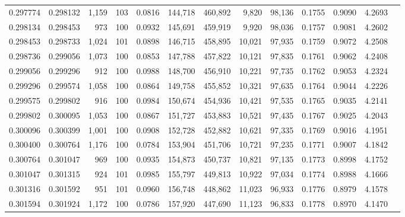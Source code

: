 \begin{tabular}{rrrrrrrrrrrrr}
0.297774 & 0.298132 & 1,159 & 103 &                                     0.0816 & 144,718 & 460,892 &   9,820 &  98,136 & 0.1755 & 0.9090 & 4.2693 \\
0.298134 & 0.298453 &   973 & 100 &                                     0.0932 & 145,691 & 459,919 &   9,920 &  98,036 & 0.1757 & 0.9081 & 4.2602 \\
0.298453 & 0.298733 & 1,024 & 101 &                                     0.0898 & 146,715 & 458,895 &  10,021 &  97,935 & 0.1759 & 0.9072 & 4.2508 \\
0.298736 & 0.299056 & 1,073 & 100 &                                     0.0853 & 147,788 & 457,822 &  10,121 &  97,835 & 0.1761 & 0.9062 & 4.2408 \\
0.299056 & 0.299296 &   912 & 100 &                                     0.0988 & 148,700 & 456,910 &  10,221 &  97,735 & 0.1762 & 0.9053 & 4.2324 \\
0.299296 & 0.299574 & 1,058 & 100 &                                     0.0864 & 149,758 & 455,852 &  10,321 &  97,635 & 0.1764 & 0.9044 & 4.2226 \\
0.299575 & 0.299802 &   916 & 100 &                                     0.0984 & 150,674 & 454,936 &  10,421 &  97,535 & 0.1765 & 0.9035 & 4.2141 \\
0.299802 & 0.300095 & 1,053 & 100 &                                     0.0867 & 151,727 & 453,883 &  10,521 &  97,435 & 0.1767 & 0.9025 & 4.2043 \\
0.300096 & 0.300399 & 1,001 & 100 &                                     0.0908 & 152,728 & 452,882 &  10,621 &  97,335 & 0.1769 & 0.9016 & 4.1951 \\
0.300400 & 0.300764 & 1,176 & 100 &                                     0.0784 & 153,904 & 451,706 &  10,721 &  97,235 & 0.1771 & 0.9007 & 4.1842 \\
0.300764 & 0.301047 &   969 & 100 &                                     0.0935 & 154,873 & 450,737 &  10,821 &  97,135 & 0.1773 & 0.8998 & 4.1752 \\
0.301047 & 0.301315 &   924 & 101 &                                     0.0985 & 155,797 & 449,813 &  10,922 &  97,034 & 0.1774 & 0.8988 & 4.1666 \\
0.301316 & 0.301592 &   951 & 101 &                                     0.0960 & 156,748 & 448,862 &  11,023 &  96,933 & 0.1776 & 0.8979 & 4.1578 \\
0.301594 & 0.301924 & 1,172 & 100 &                                     0.0786 & 157,920 & 447,690 &  11,123 &  96,833 & 0.1778 & 0.8970 & 4.1470 \\

\end{tabular}
